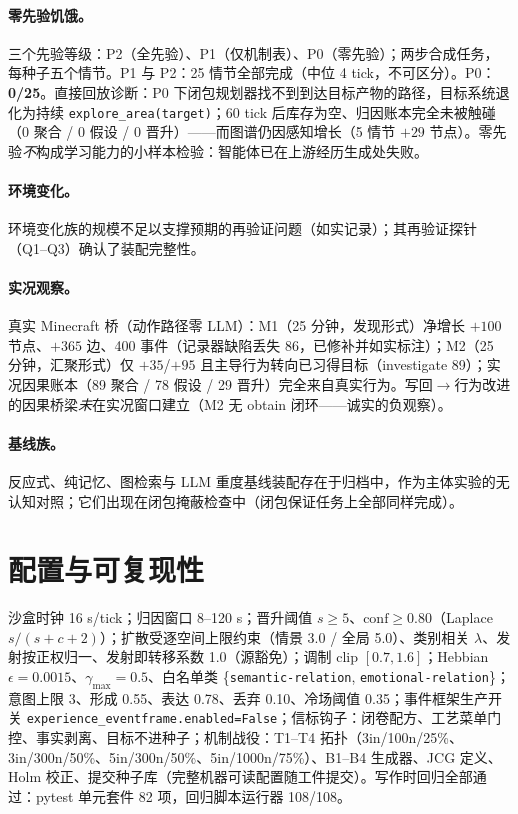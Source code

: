 \documentclass[10pt,a4paper]{ctexart}
\begin{document}
\paragraph{零先验饥饿。}三个先验等级：P2（全先验）、P1（仅机制表）、P0（零先验）；两步合成任务，每种子五个情节。P1 与 P2：25 情节全部完成（中位 4 tick，不可区分）。P0：\textbf{0/25}。直接回放诊断：P0 下闭包规划器找不到到达目标产物的路径，目标系统退化为持续 \texttt{explore\_area(target)}；60 tick 后库存为空、归因账本完全未被触碰（0 聚合 / 0 假设 / 0 晋升）——而图谱仍因感知增长（5 情节 $+29$ 节点）。零先验\emph{不}构成学习能力的小样本检验：智能体已在上游经历生成处失败。

\paragraph{环境变化。}环境变化族的规模不足以支撑预期的再验证问题（如实记录）；其再验证探针（Q1--Q3）确认了装配完整性。

\paragraph{实况观察。}真实 Minecraft 桥（动作路径零 LLM）：M1（25 分钟，发现形式）净增长 $+100$ 节点、$+365$ 边、400 事件（记录器缺陷丢失 86，已修补并如实标注）；M2（25 分钟，汇聚形式）仅 $+35$/$+95$ 且主导行为转向已习得目标（investigate 89）；实况因果账本（89 聚合 / 78 假设 / 29 晋升）完全来自真实行为。写回$\rightarrow$行为改进的因果桥梁\emph{未}在实况窗口建立（M2 无 obtain 闭环——诚实的负观察）。

\paragraph{基线族。}反应式、纯记忆、图检索与 LLM 重度基线装配存在于归档中，作为主体实验的无认知对照；它们出现在闭包掩蔽检查中（闭包保证任务上全部同样完成）。

\section{配置与可复现性}
\label{s13:config}

沙盒时钟 16 s/tick；归因窗口 8--120 s；晋升阈值 $s\ge5$、$\mathrm{conf}\ge0.80$（Laplace $s/(s+c+2)$）；扩散受逐空间上限约束（情景 3.0 / 全局 5.0）、类别相关 $\lambda$、发射按正权归一、发射即转移系数 1.0（源豁免）；调制 clip $[0.7,1.6]$；Hebbian $\epsilon{=}0.0015$、$\gamma_{\max}{=}0.5$、白名单类 \{\texttt{semantic-relation}, \texttt{emotional-relation}\}；意图上限 3、形成 0.55、表达 0.78、丢弃 0.10、冷场阈值 0.35；事件框架生产开关 \texttt{experience\_eventframe.enabled=False}；信标钩子：闭卷配方、工艺菜单门控、事实剥离、目标不进种子；机制战役：T1--T4 拓扑（3in/100n/25\%、3in/300n/50\%、5in/300n/50\%、5in/1000n/75\%）、B1--B4 生成器、JCG 定义、Holm 校正、提交种子库（完整机器可读配置随工件提交）。写作时回归全部通过：pytest 单元套件 82 项，回归脚本运行器 108/108。
\end{document}
